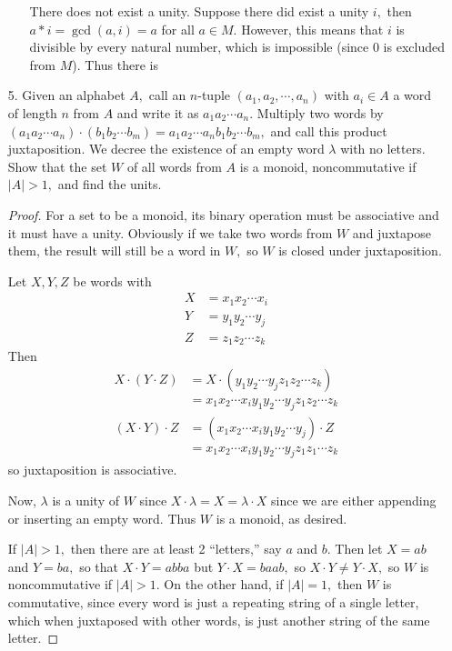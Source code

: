 \documentclass{article}
\begin{document}
\begin{itemize}
\begin{itemize}
\begin{soln}
					There does not exist a unity. Suppose there did exist a unity $i,$ then $a*i=\gcd(a, i)=a$ for all $a\in M.$ However, this means that $i$ is divisible by every natural number, which is impossible (since 0 is excluded from $M$). Thus there is 

				\end{soln}

		\end{itemize}

	\item[5.] Given an alphabet $A,$ call an $n$-tuple $(a_1, a_2, \cdots, a_n)$ with $a_i\in A$ a word of length $n$ from $A$ and write it as $a_1a_2\cdots a_n.$ Multiply two words by $(a_1a_2\cdots a_n)\cdot(b_1b_2\cdots b_m)=a_1a_2\cdots a_n b_1b_2\cdots b_m,$ and call this product juxtaposition. We decree the existence of an empty word $\lambda$ with no letters. Show that the set $W$ of all words from $A$ is a monoid, noncommutative if $\vert A\vert>1,$ and find the units.
		\begin{proof}
			For a set to be a monoid, its binary operation must be associative and it must have a unity. Obviously if we take two words from $W$ and juxtapose them, the result will still be a word in $W,$ so $W$ is closed under juxtaposition.

			Let $X, Y, Z$ be words with
			\begin{align*}
				X &= x_1x_2\cdots x_i \\
				Y &= y_1y_2\cdots y_j \\
				Z &= z_1z_2\cdots z_k
			\end{align*} Then
			\begin{align*}
				X\cdot(Y\cdot Z) &= X\cdot(y_1y_2\cdots y_j z_1z_2\cdots z_k) \\
				&= x_1x_2\cdots x_i y_1y_2\cdots y_j z_1z_2\cdots z_k \\
				(X\cdot Y)\cdot Z &= (x_1x_2\cdots x_i y_1y_2\cdots y_j)\cdot Z \\
				&= x_1x_2\cdots x_i y_1y_2\cdots y_j z_1z_1\cdots z_k
			\end{align*} so juxtaposition is associative.

			Now, $\lambda$ is a unity of $W$ since $X\cdot\lambda=X=\lambda\cdot X$ since we are either appending or inserting an empty word. Thus $W$ is a monoid, as desired. 

			If $\vert A\vert>1,$ then there are at least 2 ``letters,'' say $a$ and $b.$ Then let $X=ab$ and $Y=ba,$ so that $X\cdot Y=abba$ but $Y\cdot X=baab,$ so $X\cdot Y\neq Y\cdot X,$ so $W$ is noncommutative if $\vert A\vert>1.$ On the other hand, if $\vert A\vert =1,$ then $W$ is commutative, since every word is just a repeating string of a single letter, which when juxtaposed with other words, is just another string of the same letter.


\end{proof}
\end{itemize}
\end{document}
